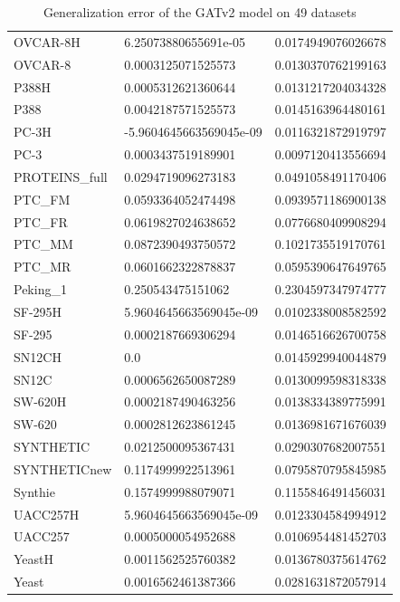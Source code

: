 \begin{table}[!ht]
\begin{tabular}{p{3.5cm}|p{5cm}p{5cm}}
    OVCAR-8H & 6.25073880655691e-05 & 0.0174949076026678 \\ 
    OVCAR-8 & 0.0003125071525573 & 0.0130370762199163 \\ 
    P388H & 0.0005312621360644 & 0.0131217204034328 \\ 
    P388 & 0.0042187571525573 & 0.0145163964480161 \\ 
    PC-3H & -5.9604645663569045e-09 & 0.0116321872919797 \\ 
    PC-3 & 0.0003437519189901 & 0.0097120413556694 \\ 
    PROTEINS\_full & 0.0294719096273183 & 0.0491058491170406 \\ 
    PTC\_FM & 0.0593364052474498 & 0.0939571186900138 \\ 
    PTC\_FR & 0.0619827024638652 & 0.0776680409908294 \\ 
    PTC\_MM & 0.0872390493750572 & 0.1021735519170761 \\ 
    PTC\_MR & 0.0601662322878837 & 0.0595390647649765 \\ 
    Peking\_1 & 0.250543475151062 & 0.2304597347974777 \\ 
    SF-295H & 5.9604645663569045e-09 & 0.0102338008582592 \\ 
    SF-295 & 0.0002187669306294 & 0.0146516626700758 \\ 
    SN12CH & 0.0 & 0.0145929940044879 \\ 
    SN12C & 0.0006562650087289 & 0.0130099598318338 \\ 
    SW-620H & 0.0002187490463256 & 0.0138334389775991 \\ 
    SW-620 & 0.0002812623861245 & 0.0136981671676039 \\ 
    SYNTHETIC & 0.0212500095367431 & 0.0290307682007551 \\ 
    SYNTHETICnew & 0.1174999922513961 & 0.0795870795845985 \\ 
    Synthie & 0.1574999988079071 & 0.1155846491456031 \\ 
    UACC257H & 5.9604645663569045e-09 & 0.0123304584994912 \\ 
    UACC257 & 0.0005000054952688 & 0.0106954481452703 \\ 
    YeastH & 0.0011562525760382 & 0.0136780375614762 \\ 
    Yeast & 0.0016562461387366 & 0.0281631872057914 \\ 
    \bottomrule
    \end{tabular}
    \caption{Generalization error of the GATv2 model on 49 datasets}
    \label{tab:ge_gatv2} %
\end{table}


